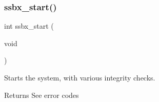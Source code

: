 \subsubsection{\texorpdfstring{ssbx\+\_\+start()}{ssbx\_start()}}
{\footnotesize\ttfamily int ssbx\+\_\+start (\begin{DoxyParamCaption}\item[{void}]{ }\end{DoxyParamCaption})}



Starts the system, with various integrity checks. 

\begin{DoxyReturn}{Returns}
See error codes 
\end{DoxyReturn}
